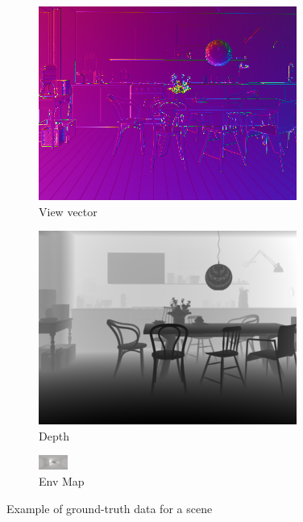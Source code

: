 \begin{figure}
\begin{subfigure}{0.3\linewidth}
    \includegraphics[width=\linewidth]{praca/images/AI43_001_Cam01.VRaySamplerInfoView.png}
    \caption{View vector}
  \end{subfigure}
  \begin{subfigure}{0.3\linewidth}
    \includegraphics[width=\linewidth]{praca/images/AI43_001_Cam01.VRayZDepth.png}
    \caption{Depth}
  \end{subfigure}
  \begin{subfigure}{0.3\linewidth}
    \includegraphics[width=\linewidth]{praca/images/AI43_001_Cam01.360.png}
    \caption{Env Map}
  \end{subfigure}
  \caption[Example of GT data for a scene]{Example of ground-truth data for a scene}
  \label{fig:dataset-gt}
\end{figure}